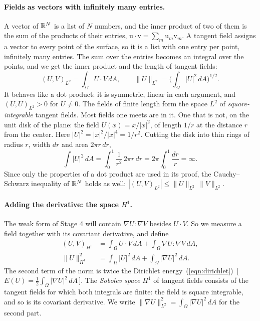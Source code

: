\paragraph{Fields as vectors with infinitely many entries.} A vector of $\mathbb{R}^N$ is a list of $N$ numbers, and the inner product of two of them is the sum of the products of their entries, $\mathrm u\cdot \mathrm v = \sum_m \mathrm u_m \mathrm v_m$. A tangent field assigns a vector to every point of the surface, so it is a list with one entry per point, infinitely many entries. The sum over the entries becomes an integral over the points, and we get the inner product and the length of tangent fields:
\begin{equation}
\label{eqn:r1_L2}
(U, V)_{L^2} = \int_\Omega U\cdot V\, dA, \qquad \|U\|_{L^2} = \Big(\int_\Omega |U|^2\, dA\Big)^{1/2} .
\end{equation}
It behaves like a dot product: it is symmetric, linear in each argument, and $(U, U)_{L^2} > 0$ for $U \neq 0$. The fields of finite length form the space $L^2$ of \emph{square-integrable} tangent fields. Most fields one meets are in it. One that is not, on the unit disk of the plane: the field $U(x) = x/|x|^2$, of length $1/r$ at the distance $r$ from the center. Here $|U|^2 = |x|^2/|x|^4 = 1/r^2$. Cutting the disk into thin rings of radius $r$, width $dr$ and area $2\pi r\, dr$,
\begin{equation*}
\int |U|^2\, dA = \int_0^1 \frac{1}{r^2}\, 2\pi r\, dr = 2\pi \int_0^1 \frac{dr}{r} = \infty .
\end{equation*}
Since only the properties of a dot product are used in its proof, the Cauchy--Schwarz inequality of $\mathbb{R}^N$ holds as well: $|(U, V)_{L^2}| \leq \|U\|_{L^2}\, \|V\|_{L^2}$.

\paragraph{Adding the derivative: the space $H^1$.} The weak form of Stage 4 will contain $\nabla U : \nabla V$ besides $U\cdot V$. So we measure a field together with its covariant derivative, and define
\begin{equation}
\label{eqn:r1_H1}
\begin{aligned}
(U, V)_{H^1} &= \int_\Omega U\cdot V\, dA + \int_\Omega \nabla U : \nabla V\, dA, \\
\|U\|_{H^1}^2 &= \int_\Omega |U|^2\, dA + \int_\Omega |\nabla U|^2\, dA .
\end{aligned}
\end{equation}
The second term of the norm is twice the Dirichlet energy~(\ref{eqn:dirichlet})~[\,$E(U) = \frac12\int_\Omega|\nabla U|^2\,dA$\,]. The \emph{Sobolev space} $H^1$ of tangent fields consists of the tangent fields for which both integrals are finite: the field is square integrable, and so is its covariant derivative. We write $\|\nabla U\|_{L^2}^2 = \int_\Omega |\nabla U|^2\, dA$ for the second part.

